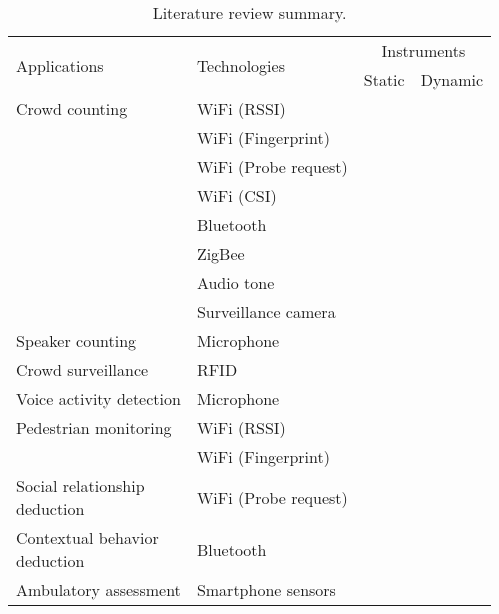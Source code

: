 \begin{table}[h]
\begin{adjustwidth}{-2cm}{}
\centering
\caption{Literature review summary.}
\label{tab:literature-summary}
\begin{tabular}{llll}
\toprule
\multirow{2}{*}{Applications} & \multirow{2}{*}{Technologies} & \multicolumn{2}{c}{Instruments} \\ \cline{3-4}
                              &                               & Static         & Dynamic        \\ \midrule
Crowd counting         & WiFi (\ac{RSSI}) & \cite{,thesis046,thesis053,thesis012,thesis052} & \\
					   & WiFi (Fingerprint) & \cite{thesis045,thesis020}&                \\
					   & WiFi (Probe request) & \cite{thesis047}&\cite{thesis057}\\
					   & WiFi (\ac{CSI}) & \cite{thesis051,thesis006}&                \\
					   & Bluetooth & \cite{thesis016}&\cite{thesis041,thesis008}\\
					   & ZigBee & \cite{thesis042,thesis043} & \\
					   & Audio tone & & \cite{thesis044}\\
					   & Surveillance camera & \cite{thesis055,thesis034} & \\
Speaker counting       & Microphone & & \cite{thesis071,thesis074,thesis067}\\
Crowd surveillance     & RFID & \cite{thesis050} & \\
Voice activity detection & Microphone & & \cite{thesis070}\\
Pedestrian monitoring  & WiFi (\ac{RSSI}) & \cite{thesis017,thesis011}&                \\
					   & WiFi (Fingerprint) & \cite{thesis033}&                \\
\specialcellleft{Social relationship\\deduction} & WiFi (Probe request) & \cite{thesis014}& \\
\specialcellleft{Contextual behavior\\deduction} & Bluetooth & & \cite{thesis028} \\
Ambulatory assessment & Smartphone sensors &                & \cite{thesis031,thesis001,thesis015,thesis030}\\ \bottomrule
\end{tabular}
\end{adjustwidth}
\end{table}

